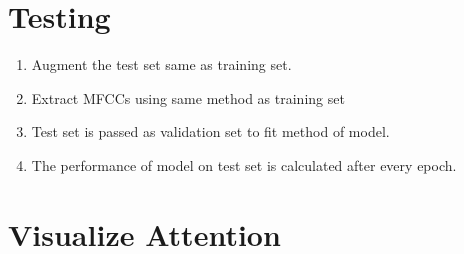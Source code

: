 \documentclass[11pt,english]{article}
\begin{document}
\section{Testing}
\begin{enumerate}
    \item Augment the test set same as training set.
    \item Extract MFCCs using same method as training set
    \item Test set is passed as validation set to fit method of model.
    \item The performance of model on test set is calculated after every epoch.
\end{enumerate}

\section{Visualize Attention}
\end{document}
